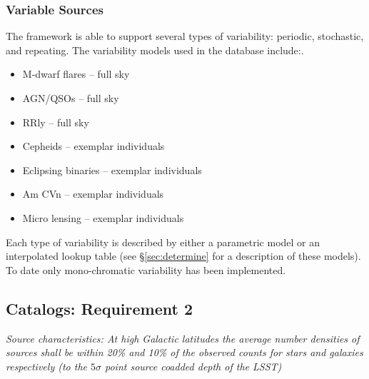\documentclass[11pt]{article}
\begin{document}
\subsubsection{Variable Sources}
The framework is able to support several types of variability:
periodic, stochastic, and repeating.  The variability models used in
the database include:.
\begin{itemize}
\item M-dwarf flares -- full sky
\item AGN/QSOs -- full sky
\item RRly -- full sky
\item Cepheids -- exemplar individuals
\item Eclipsing binaries -- exemplar individuals
\item Am CVn -- exemplar individuals
\item Micro lensing -- exemplar individuals
\end{itemize}
Each type of variability is described by either a parametric model or
an interpolated lookup table (see \S\ref{sec:determine} for a
description of these models).  To date only mono-chromatic variability
has been implemented.

\subsection{Catalogs: Requirement 2}

{\it Source characteristics: At high Galactic latitudes the average
  number densities of sources shall be within 20\% and 10\% of the
  observed counts for stars and galaxies respectively (to the
  $5\sigma$ point source coadded depth of the LSST) } \\

\end{document}
